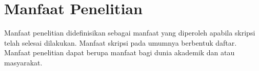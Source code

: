 %		
%
%
%
%		

\section{Manfaat Penelitian}

Manfaat penelitian didefinisikan sebagai manfaat yang diperoleh apabila 
skripsi telah selesai dilakukan. Manfaat skripsi pada umumnya berbentuk daftar. 
Manfaat penelitian dapat berupa manfaat bagi dunia akademik dan atau masyarakat.

